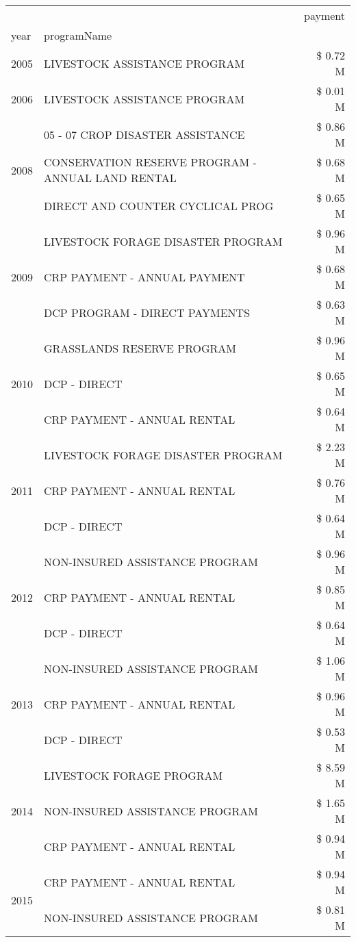 \begin{tabular}{llr}
\toprule
 &  & payment \\
year & programName &  \\
\midrule
2005 & LIVESTOCK ASSISTANCE PROGRAM & \$ 0.72 M \\
\cline{1-3}
2006 & LIVESTOCK ASSISTANCE PROGRAM & \$ 0.01 M \\
\cline{1-3}
\multirow[t]{3}{*}{2008} & 05 - 07 CROP DISASTER ASSISTANCE & \$ 0.86 M \\
 & CONSERVATION RESERVE PROGRAM - ANNUAL LAND RENTAL & \$ 0.68 M \\
 & DIRECT AND COUNTER CYCLICAL PROG & \$ 0.65 M \\
\cline{1-3}
\multirow[t]{3}{*}{2009} & LIVESTOCK FORAGE DISASTER  PROGRAM & \$ 0.96 M \\
 & CRP PAYMENT - ANNUAL PAYMENT & \$ 0.68 M \\
 & DCP PROGRAM - DIRECT PAYMENTS & \$ 0.63 M \\
\cline{1-3}
\multirow[t]{3}{*}{2010} & GRASSLANDS RESERVE PROGRAM & \$ 0.96 M \\
 & DCP - DIRECT & \$ 0.65 M \\
 & CRP PAYMENT - ANNUAL RENTAL & \$ 0.64 M \\
\cline{1-3}
\multirow[t]{3}{*}{2011} & LIVESTOCK FORAGE DISASTER PROGRAM & \$ 2.23 M \\
 & CRP PAYMENT - ANNUAL RENTAL & \$ 0.76 M \\
 & DCP - DIRECT & \$ 0.64 M \\
\cline{1-3}
\multirow[t]{3}{*}{2012} & NON-INSURED ASSISTANCE PROGRAM & \$ 0.96 M \\
 & CRP PAYMENT - ANNUAL RENTAL & \$ 0.85 M \\
 & DCP - DIRECT & \$ 0.64 M \\
\cline{1-3}
\multirow[t]{3}{*}{2013} & NON-INSURED ASSISTANCE PROGRAM & \$ 1.06 M \\
 & CRP PAYMENT - ANNUAL RENTAL & \$ 0.96 M \\
 & DCP - DIRECT & \$ 0.53 M \\
\cline{1-3}
\multirow[t]{3}{*}{2014} & LIVESTOCK FORAGE PROGRAM & \$ 8.59 M \\
 & NON-INSURED ASSISTANCE PROGRAM & \$ 1.65 M \\
 & CRP PAYMENT - ANNUAL RENTAL & \$ 0.94 M \\
\cline{1-3}
\multirow[t]{3}{*}{2015} & CRP PAYMENT - ANNUAL RENTAL & \$ 0.94 M \\
 & NON-INSURED ASSISTANCE PROGRAM & \$ 0.81 M \\

\end{tabular}
